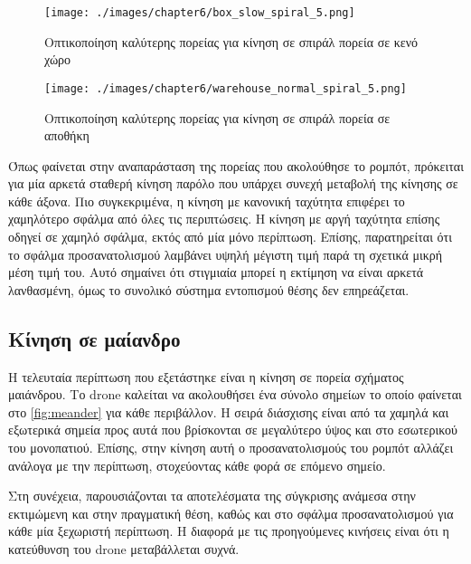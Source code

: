 \begin{figure}[!ht]
    \centering
    \texttt{[image: ./images/chapter6/box\_slow\_spiral\_5.png]}
    \caption{Οπτικοποίηση καλύτερης πορείας για κίνηση σε σπιράλ πορεία σε κενό χώρο}
    \label{fig:path_spiral_slow_corridor}
\end{figure}

\begin{figure}[!ht]
    \centering
    \texttt{[image: ./images/chapter6/warehouse\_normal\_spiral\_5.png]}
    \caption{Οπτικοποίηση καλύτερης πορείας για κίνηση σε σπιράλ πορεία σε αποθήκη}
    \label{fig:path_spiral_normal_warehouse}
\end{figure}

Όπως φαίνεται στην αναπαράσταση της πορείας που ακολούθησε το ρομπότ, πρόκειται για μία αρκετά σταθερή κίνηση παρόλο που υπάρχει συνεχή μεταβολή της κίνησης σε κάθε άξονα. Πιο συγκεκριμένα, η κίνηση με κανονική ταχύτητα επιφέρει το χαμηλότερο σφάλμα από όλες τις περιπτώσεις. Η κίνηση με αργή ταχύτητα επίσης οδηγεί σε χαμηλό σφάλμα, εκτός από μία μόνο περίπτωση. Επίσης, παρατηρείται ότι το σφάλμα προσανατολισμού λαμβάνει υψηλή μέγιστη τιμή παρά τη σχετικά μικρή μέση τιμή του. Αυτό σημαίνει ότι στιγμιαία μπορεί η εκτίμηση να είναι αρκετά λανθασμένη, όμως το συνολικό σύστημα εντοπισμού θέσης δεν επηρεάζεται.

\clearpage

\subsection{Κίνηση σε μαίανδρο}
\label{subsection:localization_tests_meander}

Η τελευταία περίπτωση που εξετάστηκε είναι η κίνηση σε πορεία σχήματος μαιάνδρου. Το drone καλείται να ακολουθήσει ένα σύνολο σημείων το οποίο φαίνεται στο \autoref{fig:meander} για κάθε περιβάλλον. Η σειρά διάσχισης είναι από τα χαμηλά και εξωτερικά σημεία προς αυτά που βρίσκονται σε μεγαλύτερο ύψος και στο εσωτερικού του μονοπατιού. Επίσης, στην κίνηση αυτή ο προσανατολισμούς του ρομπότ αλλάζει ανάλογα με την περίπτωση, στοχεύοντας κάθε φορά σε επόμενο σημείο.

Στη συνέχεια, παρουσιάζονται τα αποτελέσματα της σύγκρισης ανάμεσα στην εκτιμώμενη και στην πραγματική θέση, καθώς και στο σφάλμα προσανατολισμού για κάθε μία ξεχωριστή περίπτωση. Η διαφορά με τις προηγούμενες κινήσεις είναι ότι η κατεύθυνση του drone μεταβάλλεται συχνά.

